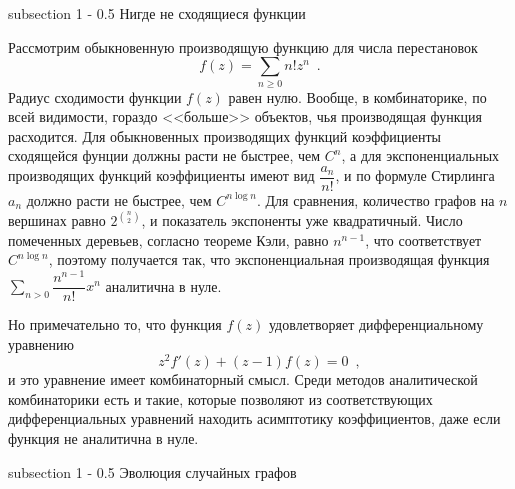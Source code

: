 \documentclass{article}
\makeatletter
\theoremstyle{definition}
\renewcommand{\subsection}{\@startsection
{subsection}%
{1}%
{\z@}%
{-\baselineskip}%
{0.5\baselineskip}%
{\centering\large\scshape}} %
\makeatother
\begin{document}
\subsection{Нигде не сходящиеся функции}

Рассмотрим обыкновенную производящую функцию для числа перестановок
\[
	f(z) = \sum_{n \geq 0} n! z^n \enspace .
\]
Радиус сходимости функции \( f(z) \) равен нулю. Вообще, в комбинаторике, по 
всей видимости, гораздо <<больше>> объектов, чья производящая функция 
расходится. Для обыкновенных производящих функций коэффициенты сходящейся 
фунции должны расти не быстрее, чем \( C^{n} \), а для экспоненциальных 
производящих функций коэффициенты имеют вид \( \dfrac{a_n}{n!} \), и по формуле 
Стирлинга \( a_n \) должно расти не быстрее, чем \( C^{n \log n} \). Для 
сравнения, количество графов на \( n \) вершинах равно \( 2^{{n \choose 2}} \), 
и показатель экспоненты уже квадратичный. Число помеченных деревьев, согласно 
теореме Кэли, равно \( n^{n-1} \), что соответствует \( C^{n \log n} \), 
поэтому получается так, что экспоненциальная производящая функция \( \sum_{n > 
0} \dfrac{n^{n-1}}{n!} x^n \) аналитична в нуле.

Но примечательно то, что функция \( f(z) \) удовлетворяет дифференциальному 
уравнению
\[
	z^2 f'(z) + (z-1) f(z) = 0 \enspace ,
\]
и это уравнение имеет комбинаторный смысл. Среди методов аналитической 
комбинаторики есть и такие, которые позволяют из соответствующих 
дифференциальных уравнений находить асимптотику коэффициентов, даже если 
функция не аналитична в нуле.

\subsection{Эволюция случайных графов}
\end{document}
